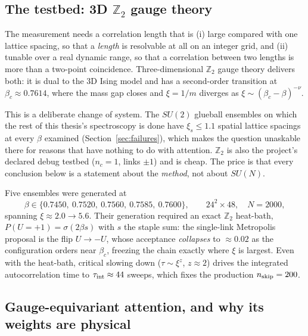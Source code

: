 \documentclass[11pt,a4paper]{article}
\begin{document}
\subsection{The testbed: 3D $\mathbb{Z}_2$ gauge theory}
\label{sec:z2}

The measurement needs a correlation length that is (i) large compared with one
lattice spacing, so that a \emph{length} is resolvable at all on an integer
grid, and (ii) tunable over a real dynamic range, so that a correlation between
two lengths is more than a two-point coincidence. Three-dimensional
$\mathbb{Z}_2$ gauge theory delivers both: it is dual to the 3D Ising model and
has a second-order transition at $\beta_c \approx 0.7614$, where the mass gap
closes and $\xi = 1/m$ diverges as $\xi \sim (\beta_c-\beta)^{-\nu}$.

This is a deliberate change of system. The $SU(2)$ glueball ensembles on which
the rest of this thesis's spectroscopy is done have $\xi_s \le 1.1$ spatial
lattice spacings at every $\beta$ examined (Section~\ref{sec:failures}), which
makes the question unaskable there for reasons that have nothing to do with
attention. $\mathbb{Z}_2$ is also the project's declared debug testbed
($n_c = 1$, links $\pm1$) and is cheap. The price is that every conclusion below
is a statement about the \emph{method}, not about $SU(N)$.

Five ensembles were generated at
\begin{equation}
  \beta \in \{0.7450,\ 0.7520,\ 0.7560,\ 0.7585,\ 0.7600\},
  \qquad 24^2\times48, \quad N = 2000,
\end{equation}
spanning $\xi \approx 2.0 \to 5.6$. Their generation required an exact
$\mathbb{Z}_2$ heat-bath, $P(U=+1) = \sigma(2\beta s)$ with $s$ the staple sum:
the single-link Metropolis proposal is the flip $U \to -U$, whose acceptance
\emph{collapses} to $\approx 0.02$ as the configuration orders near $\beta_c$,
freezing the chain exactly where $\xi$ is largest. Even with the heat-bath,
critical slowing down ($\tau \sim \xi^z$, $z\approx2$) drives the integrated
autocorrelation time to $\tau_{\rm int} \approx 44$ sweeps, which fixes the
production $n_{\rm skip} = 200$.

\subsection{Gauge-equivariant attention, and why its weights are physical}
\label{sec:gemhsa}
\end{document}
